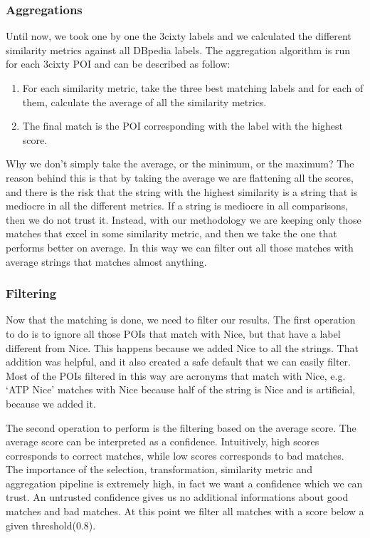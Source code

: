 \documentclass[paper=a4, fontsize=11pt]{scrartcl}
\begin{document}
\subsubsection{Aggregations}
Until now, we took one by one the 3cixty labels and we calculated the different similarity metrics against all DBpedia labels. 
The aggregation algorithm is run for each 3cixty POI and can be described as follow:
\begin{enumerate}
\item For each similarity metric, take the three best matching labels and for each of them, calculate the average of all the similarity metrics.
\item The final match is the POI corresponding with the label with the highest score.
\end{enumerate}
Why we don't simply take the average, or the minimum, or the maximum?
The reason behind this is that by taking the average we are flattening all the scores, and there is the risk that the string with the highest similarity is a string that is mediocre in all the different metrics. If a string is mediocre in all comparisons, then we do not trust it. Instead, with our methodology we are keeping only those matches that excel in some similarity metric, and then we take the one that performs better on average. In this way we can filter out all those matches with average strings that matches almost anything.

\subsubsection{Filtering}
Now that the matching is done, we need to filter our results.
The first operation to do is to ignore all those POIs that match with Nice, but that have a label different from Nice. This happens because we added Nice to all the strings. That addition was helpful, and it also created a safe default that we can easily filter.
Most of the POIs filtered in this way are acronyms that match with Nice, e.g. `ATP Nice' matches with Nice because half of the string is Nice and is artificial, because we added it.

The second operation to perform is the filtering based on the average score.
The average score can be interpreted as a confidence. Intuitively, high scores corresponds to correct matches, while low scores corresponds to bad matches.
The importance of the selection, transformation, similarity metric and aggregation pipeline is extremely high, in fact we want a confidence which we can trust. An untrusted confidence gives us no additional informations about good matches and bad matches.
At this point we filter all matches with a score below a given threshold(0.8).
\end{document}
